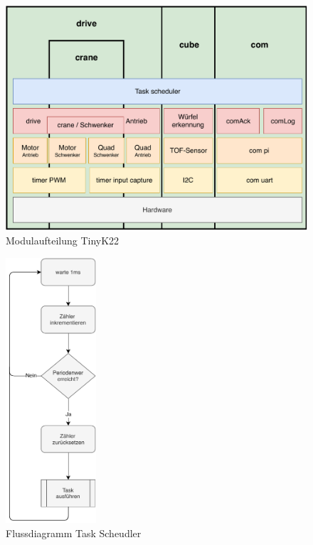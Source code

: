 \documentclass[../../main.tex]{subfiles}
\begin{document}
    \begin{figure}[H]
        \centering
        \includegraphics[width=1.0\textwidth]{../../images/et/et_mc_softwarekonzept.pdf}
        \caption {Modulaufteilung TinyK22}
        \label{fig:et_mc_softwarekonzept}
    \end{figure}

    \begin{figure}
        \centering
        \includegraphics[width=0.3\textwidth]{../../images/et/et_task_scheudler.pdf}
        \caption {Flussdiagramm Task Scheudler}
        \label{fig:et_task_scheudler}
    \end{figure}
\end{document}
